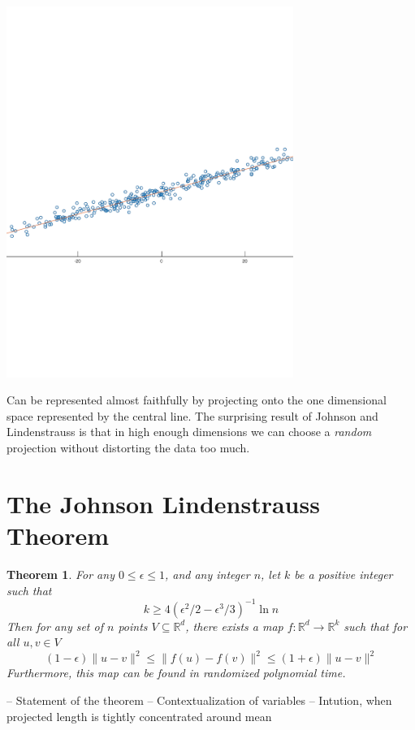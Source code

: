 \documentclass[11pt]{article}
\newcommand{\arr}{\rightarrow}
\newcommand{\R}{\mathbb{R}}
\newtheorem{Thm}{Theorem}
\begin{document}
\begin{center}
    \includegraphics[trim=0 240 0 280, clip,width=0.7\textwidth]{2dprimaryaxis.pdf}
\end{center}

Can be represented almost faithfully by projecting onto the one dimensional space represented by the central line. The surprising result of Johnson and Lindenstrauss is that in high enough dimensions we can choose a \textit{random} projection without distorting the data too much.



\section{The Johnson Lindenstrauss Theorem}
\begin{Thm}
    For any $0 \leq \epsilon \leq 1$, and any integer $n$, let $k$ be a positive integer such that
    \[ k \geq 4(\epsilon^2/2 - \epsilon^3/3)^{-1} \ln n \]
    Then for any set of $n$ points $V \subseteq \R^d$, there exists a map $f:\R^d \arr \R^k$ such that for all $u, v \in V$
    \[(1-\epsilon)\|u - v\|^2 \leq \| f(u) - f(v) \|^2 \leq (1+\epsilon) \| u - v \|^2 \]
    Furthermore, this map can be found in randomized polynomial time.
\end{Thm}
-- Statement of the theorem
-- Contextualization of variables
-- Intution, when projected length is tightly concentrated around mean
\end{document}
